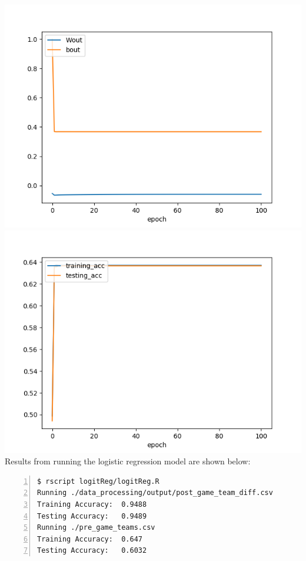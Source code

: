 \documentclass[12pt]{article}
\begin{document}
\includegraphics[scale=0.4]{NCAA_0_1_compact_weights.png} \includegraphics[scale=0.4]{NCAA_0_1_compact_accuracy.png} \\ 


\quad Results from running the logistic regression model are shown below:


\lstset{upquote=true}
\begin{lstlisting}[basicstyle=\small, numbers=left]
$ rscript logitReg/logitReg.R 
Running ./data_processing/output/post_game_team_diff.csv
Training Accuracy:	0.9488
Testing Accuracy:	0.9489
Running ./pre_game_teams.csv
Training Accuracy:	0.647
Testing Accuracy:	0.6032
\end{lstlisting}
\end{document}
